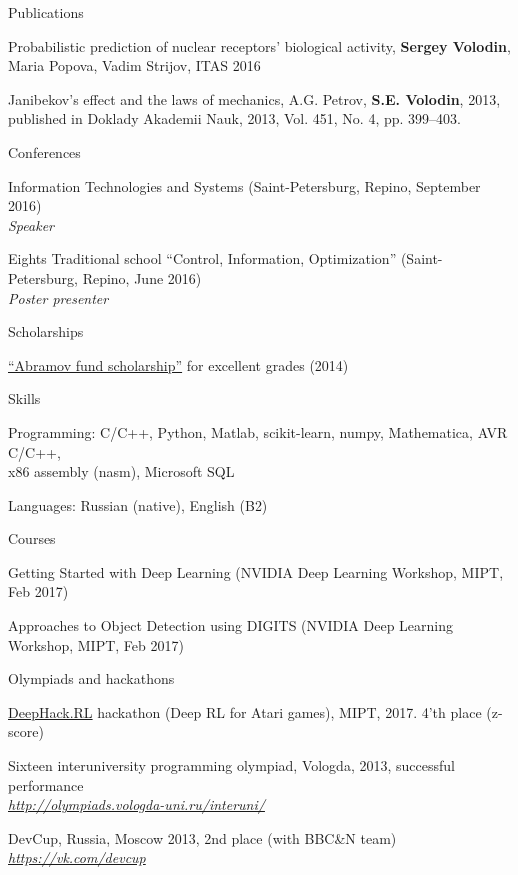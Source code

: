 \documentclass{resume} %
\begin{document}
\begin{rSection}{Publications}
\item Probabilistic prediction of nuclear receptors’ biological activity, {\bf Sergey Volodin}, Maria Popova, Vadim Strijov, ITAS 2016
\item Janibekov’s effect and the laws of mechanics, A.G. Petrov, {\bf S.E. Volodin}, 2013, published in Doklady Akademii Nauk, 2013, Vol. 451, No. 4, pp. 399–403.
\end{rSection}

\newpage

\begin{rSection}{Conferences}
\item Information Technologies and Systems (Saint-Petersburg, Repino, September 2016)\\
{\em Speaker}
\item Eights Traditional school “Control, Information, Optimization” (Saint-Petersburg, Repino, June 2016)\\
{\em Poster presenter}
\end{rSection}

\begin{rSection}{Scholarships}
\item \href{http://phystech-foundation.org/}{``Abramov fund scholarship''} for excellent grades (2014)
\end{rSection}

\begin{rSection}{Skills}
\item Programming: C/C++, Python, Matlab, scikit-learn, numpy, Mathematica, AVR C/C++,\\ x86 assembly (nasm), Microsoft SQL
\item Languages: Russian (native), English (B2)
\end{rSection}

\begin{rSection}{Courses}
	\item Getting Started with Deep Learning (NVIDIA Deep Learning Workshop, MIPT, Feb 2017)
	\item Approaches to Object Detection using DIGITS (NVIDIA Deep Learning Workshop, MIPT, Feb 2017)
\end{rSection}

\begin{rSection}{Olympiads and hackathons}
\item \href{http://rl.deephack.me/}{DeepHack.RL} hackathon (Deep RL for Atari games), MIPT, 2017. 4'th place (z-score)
\item Sixteen interuniversity programming olympiad, Vologda, 2013, successful performance \\
\hfill {\em \url{http://olympiads.vologda-uni.ru/interuni/}}
\item DevCup, Russia, Moscow 2013, 2nd place (with BBC\&N team)\\
\hfill {\em \url{https://vk.com/devcup}}
\end{rSection}
\end{document}
